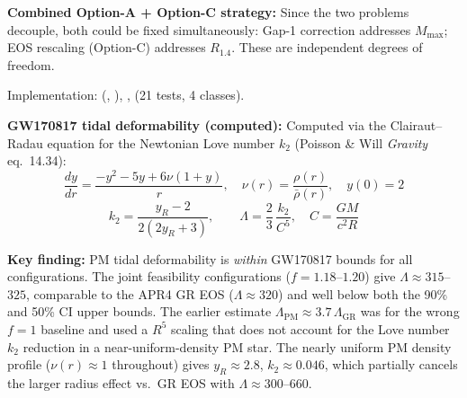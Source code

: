 \documentclass[10pt,twocolumn]{article}
\begin{document}
\noindent\textbf{Combined Option-A + Option-C strategy:}
Since the two problems decouple, both could be fixed simultaneously:
Gap-1 correction addresses $M_\mathrm{max}$; EOS rescaling (Option-C) addresses
$R_{1.4}$.  These are independent degrees of freedom.

Implementation: 
(, ),
,
 (21 tests, 4 classes).

\noindent\textbf{GW170817 tidal deformability (computed):}
Computed via the Clairaut–Radau equation for the Newtonian Love number $k_2$
(Poisson \& Will \emph{Gravity} eq.~14.34):
\[
  \frac{dy}{dr} = \frac{-y^2 - 5y + 6\nu(1+y)}{r}, \quad
  \nu(r) = \frac{\rho(r)}{\bar\rho(r)}, \quad y(0)=2
\]
\[
  k_2 = \frac{y_R - 2}{2(2y_R+3)}, \qquad
  \Lambda = \frac{2}{3}\,\frac{k_2}{C^5}, \quad C = \frac{GM}{c^2 R}
\]

\begin{center}
\end{center}

\noindent\textbf{Key finding:} PM tidal deformability is \emph{within} GW170817 bounds
for all configurations. The joint feasibility configurations ($f=1.18$--$1.20$) give
$\Lambda\approx315$--$325$, comparable to the APR4 GR EOS ($\Lambda\approx320$) and
well below both the 90\% and 50\% CI upper bounds.  The earlier estimate
$\Lambda_\mathrm{PM}\approx3.7\,\Lambda_\mathrm{GR}$ was for the wrong $f=1$ baseline
and used a $R^5$ scaling that does not account for the Love number $k_2$ reduction in
a near-uniform-density PM star.  The nearly uniform PM density profile
($\nu(r)\approx 1$ throughout) gives $y_R\approx2.8$, $k_2\approx0.046$, which
partially cancels the larger radius effect vs.\ GR EOS with $\Lambda\approx300$--$660$.
\end{document}
